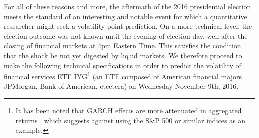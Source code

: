 \documentclass[11pt,3p,review,authoryear]{elsarticle}
\theoremstyle{definition}
\begin{document}
For all of these reasons and more, the aftermath of the 2016 presidential election meets the standard of an interesting and notable event for which a quantitative researcher might seek a volatility point prediction.  On a more technical level, the election outcome was not known until the evening of election day, well after the closing of financial markets at 4pm Eastern Time.  This satisfies the condition that the shock be not yet digested by liquid markets.  We therefore proceed to make the following technical specifications in order to predict the volatility of financial services ETF IYG\footnote{It has been noted that GARCH effects are more attenuated in aggregated returns \citep{zivot2009practical}, which suggests against using the S\&P 500 or similar indices as an example.} (an ETF composed of American financial majors JPMorgan, Bank of American, etcetera) on Wednesday November 9th, 2016.
\end{document}
